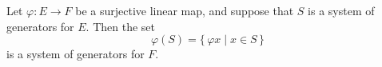 Let $\varphi: E \rightarrow F$ be a surjective linear map, and suppose that $S$ is a system of generators for $E$. Then the set
$$
\varphi(S) = \{\, \varphi x \mid x \in S \,\}
$$
is a system of generators for $F$.
